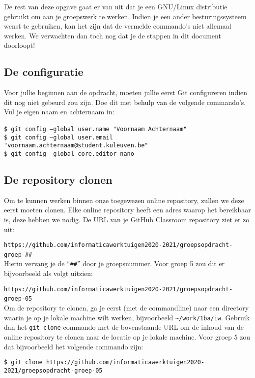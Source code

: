 \documentclass[a4paper]{article}
\begin{document}
De rest van deze opgave gaat er van uit dat je een GNU/Linux distributie gebruikt om aan je groepswerk te werken.
Indien je een ander besturingssysteem wenst te gebruiken, kan het zijn dat de vermelde commando’s niet allemaal werken.
We verwachten dan toch nog dat je de stappen in dit document doorloopt!


\subsection{De configuratie}
Voor jullie beginnen aan de opdracht, moeten jullie eerst Git configureren indien dit nog niet gebeurd zou zijn.
Doe dit met behulp van de volgende commando’s. Vul je eigen naam en achternaam in:

\break
\noindent
\texttt{\$ git config --global user.name "Voornaam Achternaam"} \\
\texttt{\$ git config --global user.email "voornaam.achternaam@student.kuleuven.be"} \\
\texttt{\$ git config --global core.editor nano} \\


\subsection{De repository clonen}
Om te kunnen werken binnen onze toegewezen online repository, zullen we deze eerst moeten clonen.
Elke online repository heeft een adres waarop het bereikbaar is, deze hebben we nodig.
De URL van je GitHub Classroom repository ziet er zo uit:

\texttt{https://github.com/informaticawerktuigen2020-2021/groepsopdracht-groep-\#\#} \\

Hierin vervang je de ``\texttt{\#\#}'' door je groepsnummer.
Voor groep 5 zou dit er bijvoorbeeld als volgt uitzien:

\texttt{https://github.com/informaticawerktuigen2020-2021/groepsopdracht-groep-05} \\

Om de repository te clonen, ga je eerst (met de commandline) naar een directory waarin je op je lokale machine wilt werken, bijvoorbeeld \texttt{\textasciitilde/work/1ba/iw}.
Gebruik dan het \texttt{git clone} commando met de bovenstaande URL om de inhoud van de online repository te clonen naar de locatie op je lokale machine.
Voor groep 5 zou dat bijvoorbeeld het volgende commando zijn:

\texttt{\$ git clone https://github.com/informaticawerktuigen2020-2021/groepsopdracht-groep-05} \\
\end{document}
